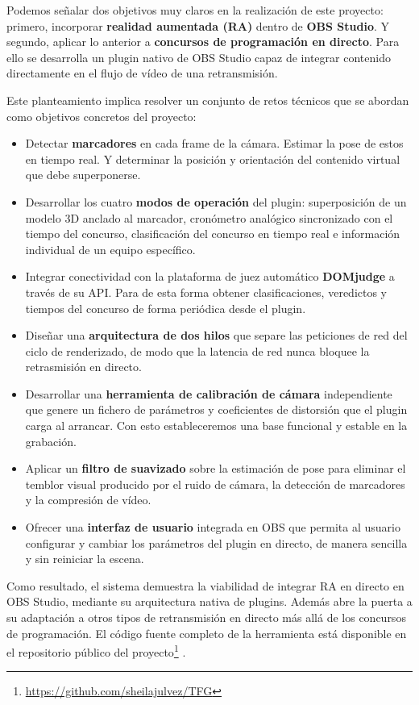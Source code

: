     Podemos señalar dos objetivos muy claros en la realización de este proyecto: primero, incorporar \textbf{realidad aumentada (RA)} dentro de \textbf{OBS Studio}. Y segundo, aplicar lo anterior a \textbf{concursos de programación en directo}. Para ello se desarrolla un plugin nativo de OBS Studio capaz de integrar contenido directamente en el flujo de vídeo de una retransmisión.
    
    Este planteamiento implica resolver un conjunto de retos técnicos que se abordan como objetivos concretos del proyecto:
    
    \begin{itemize}
      \item Detectar \textbf{marcadores} en cada frame de la cámara. Estimar la pose de estos en tiempo real. Y  determinar la posición y orientación del contenido virtual que debe superponerse.
  \item Desarrollar los cuatro \textbf{modos de operación} del plugin: superposición de un modelo 3D anclado al marcador, cronómetro analógico sincronizado con el tiempo del concurso, clasificación del concurso en tiempo real e información individual de un equipo específico.
  \item Integrar conectividad con la plataforma de juez automático \textbf{DOMjudge} a través de su API. Para de esta forma obtener clasificaciones, veredictos y tiempos del concurso de forma periódica desde el plugin.
  \item Diseñar una \textbf{arquitectura de dos hilos} que separe las peticiones de red del ciclo de renderizado, de modo que la latencia de red nunca bloquee la retrasmisión en directo.
  \item Desarrollar una \textbf{herramienta de calibración de cámara} independiente que genere un fichero de parámetros y coeficientes de distorsión que el plugin carga al arrancar. Con esto estableceremos una base funcional y estable en la grabación.
  \item Aplicar un \textbf{filtro de suavizado} sobre la estimación de pose para eliminar el temblor visual producido por el ruido de cámara, la detección de marcadores y la compresión de vídeo.
  \item Ofrecer una \textbf{interfaz de usuario} integrada en OBS que permita al usuario configurar y cambiar los parámetros del plugin en directo, de manera sencilla y sin reiniciar la escena.
\end{itemize}

Como resultado, el sistema demuestra la viabilidad de integrar RA en directo en OBS Studio, mediante su arquitectura nativa de plugins. Además abre la puerta a su adaptación a otros tipos de retransmisión en directo más allá de los concursos de programación. El código fuente completo de la herramienta está disponible en el repositorio público del proyecto\footnote{\url{https://github.com/sheilajulvez/TFG}} \citep{PluginRepo}.

